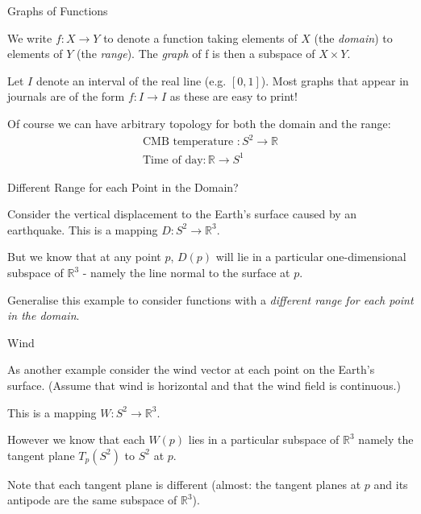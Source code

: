 \documentclass{beamer}
\begin{document}
\begin{frame}{Graphs of Functions}

We write $f \colon X \to Y$ to denote a function taking elements of $X$ (the \textit{domain}) to elements of $Y$ (the \textit{range}). The \textit{graph} of f is then a subspace of $X \times Y$.

Let $I$ denote an interval of the real line (e.g. $[0, 1]$). Most graphs that appear in journals are of the form $f \colon I \to I$ as these are easy to print!

Of course we can have arbitrary topology for both the domain and the range:
\begin{equation*}
\begin{split}
\text{CMB temperature } \colon S^2 \to \mathbb{R} \\
\text{Time of day} \colon \mathbb{R} \to S^1
\end{split}
\end{equation*}

\end{frame}

\begin{frame}{Different Range for each Point in the Domain?}

Consider the vertical displacement to the Earth's surface caused by an earthquake. This is a mapping $D \colon S^2 \to  \mathbb{R}^3$.

But we know that at any point $p$, $D(p)$ will lie in a particular one-dimensional subspace of $\mathbb{R}^3$ - namely the line normal to the surface at $p$.

Generalise this example to consider functions with a \textit{different range for each point in the domain}.

\end{frame}

\begin{frame}{Wind}

As another example consider the wind vector at each point on the Earth's surface. (Assume that wind is horizontal and that the wind field is continuous.)

This is a mapping $W \colon S^2 \to \mathbb{R}^3$.

However we know that each $W(p)$ lies in a particular subspace of $\mathbb{R}^3$ namely the tangent plane $T_p(S^2)$ to $S^2$ at $p$.

 Note that each tangent plane is different (almost: the tangent planes at $p$ and its antipode are the same subspace of $\mathbb{R}^3$).

\end{frame}
\end{document}
